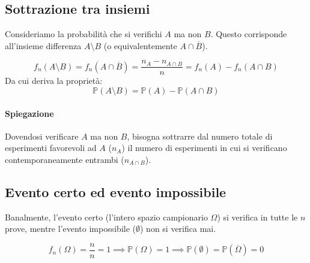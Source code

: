 \subsection{Sottrazione tra insiemi}
Consideriamo la probabilità che si verifichi $A$ ma non $B$. Questo corrisponde all'insieme differenza $A \setminus B$ (o equivalentemente $A \cap \overline{B}$).

\[
f_n(A \setminus B) = f_n(A \cap \overline{B}) = \frac{n_A - n_{A \cap B}}{n} = f_n(A) - f_n(A \cap B)
\]
Da cui deriva la proprietà:
\[
\mathbb{P}(A \setminus B) = \mathbb{P}(A) - \mathbb{P}(A \cap B)
\]

\paragraph{Spiegazione}
Dovendosi verificare $A$ ma non $B$, bisogna sottrarre dal numero totale di esperimenti favorevoli ad $A$ ($n_A$) il numero di esperimenti in cui si verificano contemporaneamente entrambi ($n_{A \cap B}$).

\subsection{Evento certo ed evento impossibile}
Banalmente, l'evento certo (l'intero spazio campionario $\Omega$) si verifica in tutte le $n$ prove, mentre l'evento impossibile ($\emptyset$) non si verifica mai.

\[
f_n(\Omega) = \frac{n}{n} = 1 \implies \mathbb{P}(\Omega) = 1 \implies \mathbb{P}(\emptyset) = \mathbb{P}(\overline{\Omega}) = 0
\]

